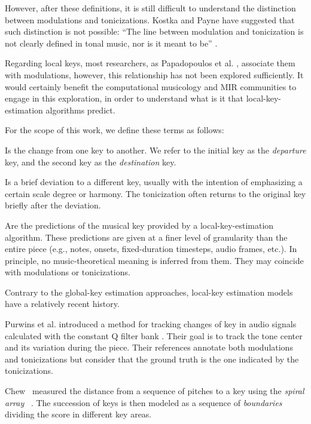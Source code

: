 However, after these definitions, it is still difficult to
understand the distinction between modulations and
tonicizations. Kostka and Payne have suggested that such
distinction is not possible: ``The line between modulation
and tonicization is not clearly defined in tonal music, nor
is it meant to be'' \parencite{kostka2008tonal}.

Regarding local keys, most researchers, as Papadopoulos et
al. \parencite{papadopoulos2009local}, associate them with
modulations, however, this relationship has not been
explored sufficiently. It would certainly benefit the
computational musicology and MIR communities to engage in
this exploration, in order to understand what is it that
local-key-estimation algorithms predict.

For the scope of this work, we define these terms as
follows:

Is the change from one key to another. We refer to the
initial key as the \emph{departure} key, and the second key
as the \emph{destination} key.

Is a brief deviation to a different key, usually with the
intention of emphasizing a certain scale degree or harmony.
The tonicization often returns to the original key briefly
after the deviation.

Are the predictions of the musical key provided by a
local-key-estimation algorithm. These predictions are given
at a finer level of granularity than the entire piece (e.g.,
notes, onsets, fixed-duration timesteps, audio frames,
etc.). In principle, no music-theoretical meaning is
inferred from them. They may coincide with modulations or
tonicizations.

\label{ssec:localkey}

Contrary to the global-key estimation approaches, local-key
estimation models have a relatively recent history.

Purwins et al. introduced a method for tracking changes of
key in audio signals %
calculated with the constant Q filter bank
\parencite{purwins2000new}. Their goal is to track the tone
center and its variation during the piece. Their references
annotate both modulations and tonicizations but consider
that the ground truth is the one indicated by the
tonicizations.

Chew~\parencite{chew2002key} measured the distance from a
sequence of pitches to a key using the \emph{spiral array}
~\parencite{chew2000towardsam}. The succession of keys is
then modeled as a sequence of \emph{boundaries} dividing the
score in different key areas.

